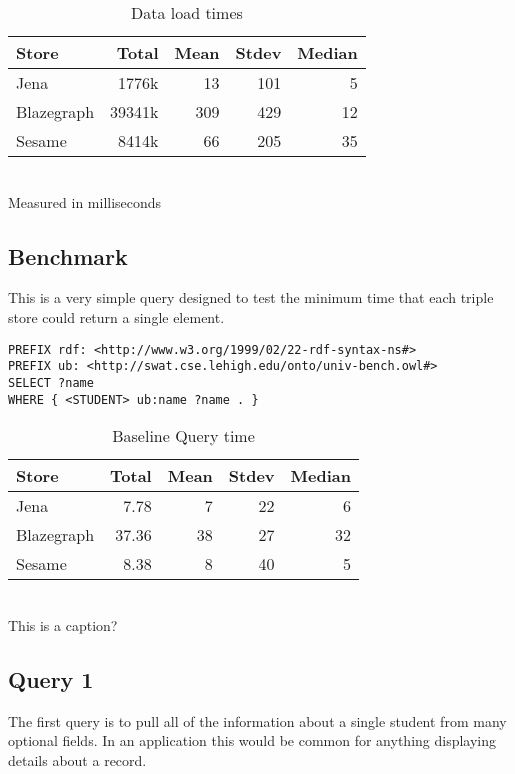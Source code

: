 \documentclass{llncs}
\begin{document}
\begin{table}
\begin{center}
\caption{Data load times}
\begin{tabular}{l | r r r r } Store & Total & Mean & Stdev & Median \\ \hline Jena & 1776k & 13 & 101 & 5 \\ Blazegraph & 39341k & 309 & 429 & 12 \\ Sesame & 8414k & 66 & 205 & 35 \end{tabular}
\\[5pt]
Measured in milliseconds
\end{center}
\end{table}

\subsection{Benchmark}

This is a very simple query designed to test the minimum time that each triple store could return a single element.

\begin{lstlisting}
PREFIX rdf: <http://www.w3.org/1999/02/22-rdf-syntax-ns#>
PREFIX ub: <http://swat.cse.lehigh.edu/onto/univ-bench.owl#>
SELECT ?name
WHERE { <STUDENT> ub:name ?name . }
\end{lstlisting}

\smallskip

\begin{table}
\begin{center}
\caption{Baseline Query time}
\begin{tabular}{l | r r r r } Store & Total & Mean & Stdev & Median \\ \hline Jena & 7.78 & 7 & 22 & 6 \\ Blazegraph & 37.36 & 38 & 27 & 32 \\ Sesame & 8.38 & 8 & 40 & 5 \end{tabular}
\\[5pt]
This is a caption?
\end{center}
\end{table}

\subsection{Query 1}

The first query is to pull all of the information about a single student from many optional fields.  In an application this would be common for anything displaying details about a record.
\end{document}
